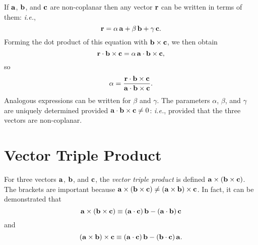 If ${\bf a}$, ${\bf b}$, and ${\bf c}$ are non-coplanar then any vector ${\bf r}$ can be
written in terms of them: {\em i.e.}, 
\begin{equation}
{\bf r} = \alpha \,{\bf a} + \beta\,{\bf b} + \gamma\, {\bf c}.
\end{equation}
Forming the dot product of this equation with ${\bf b}\times{\bf c}$, we then obtain
\begin{equation}
{\bf r}  \cdot {\bf b} \times{\bf c} = \alpha\, {\bf a}\cdot{\bf b} \times{\bf c},
\end{equation}
so
\begin{equation}
\alpha = \frac{{\bf r}\cdot{\bf b}\times{\bf c}}{{\bf a}\cdot{\bf b}\times{\bf c}}.
\end{equation}
Analogous expressions can be written for $\beta$ and $\gamma$. The parameters $\alpha$, $\beta$,
and $\gamma$ are uniquely determined provided $ {\bf a}\cdot{\bf b} \times{\bf c} \neq 0$:
{\em i.e.}, provided that the three vectors are non-coplanar. 

\section{Vector Triple Product}\label{svtp}
For three vectors ${\bf a}$, ${\bf b}$, and ${\bf c}$, the {\em vector triple product}\/ is defined
${\bf a}\times({\bf b} \times {\bf c})$. The brackets are important because
${\bf a}\times({\bf b} \times {\bf c}) \neq ({\bf a}\times{\bf b} )\times {\bf c}$. 
In fact, it can be demonstrated that
\begin{equation}
{\bf a}\times({\bf b} \times {\bf c}) \equiv ({\bf a}\cdot {\bf c}) \,{\bf b} - ({\bf a}\cdot
{\bf b})\,{\bf c}\label{e247}
\end{equation}
and
\begin{equation}
({\bf a}\times{\bf b}) \times {\bf c}\equiv ({\bf a}\cdot {\bf c}) \,{\bf b} - ({\bf b}\cdot
{\bf c})\,{\bf a}.
\end{equation}

